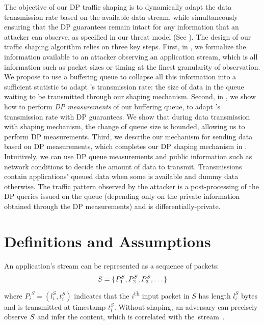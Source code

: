 The objective of our DP traffic shaping is to dynamically adapt the data transmission rate based on the available data stream, while simultaneously ensuring that the DP guarantees remain intact for any information that an attacker can observe, as specified in our threat model (See ).
The design of our traffic shaping algorithm relies on three key steps.
%
First, in , we formalize the information available to an attacker observing an application stream, which is all information such as packet sizes or timing at the finest granularity of observation.
We propose to use a buffering queue to collapse all this information into a sufficient statistic to adapt {\sys}'s transmission rate: the size of data in the queue waiting to be transmitted through our shaping mechanism.
%
Second, in , we show how to perform {\em DP measurements} of our buffering queue, to adapt \sys's transmission rate with DP guarantees.
We show that during data transmission with {\sys} shaping mechanism, the change of queue size is bounded, allowing us to perform DP measurements.
%
Third, we describe our mechanism for sending data based on DP measurements, which completes our DP shaping mechanism in .
Intuitively, we can use DP queue measurements and public information such as network conditions to decide the amount of data to transmit.
Transmissions contain applications' queued data when some is available and dummy data otherwise.
The traffic pattern observed by the attacker is a post-processing of the DP queries issued on the queue (depending only on the private information obtained through the DP measurements) and is differentially-private.


\section{Definitions and Assumptions}
\label{sec:dp-shaping-definitions}
An application's stream can be represented as a sequence of packets:
\begin{equation}
    S = \{{P^S_1}, {P^S_2}, {P^S_3}, \dots \}
\end{equation}
where ${P_i}^S = (l^S_i, t^S_i)$ indicates that the $i$\textsuperscript{th} input packet in $S$ has length $l_i^S$ bytes and is transmitted at timestamp $t_i^S$.
Without shaping, an adversary can precisely observe $S$ and infer the content, which is correlated with the~stream~\cite{schuster2017beautyburst}.

